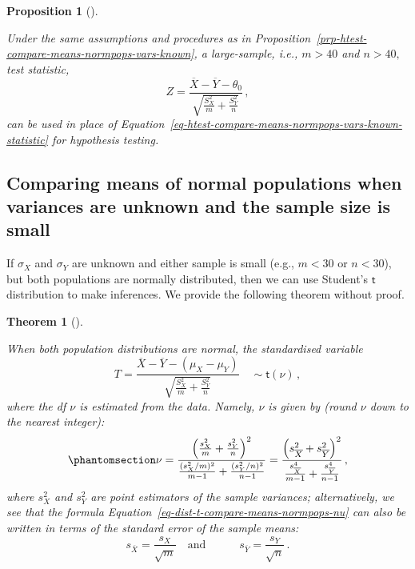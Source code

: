\documentclass[
  a4paper,
  DIV=11,
  numbers=noendperiod,
  oneside]{scrreprt}
\theoremstyle{plain}
\newtheorem{theorem}{Theorem}[chapter]
\theoremstyle{definition}
\theoremstyle{definition}
\theoremstyle{definition}
\theoremstyle{plain}
\newtheorem{proposition}{Proposition}[chapter]
\theoremstyle{remark}
\begin{document}
\begin{proposition}[]\protect\hypertarget{prp-htest-compare-means-large-samples}{}\label{prp-htest-compare-means-large-samples}

Under the same assumptions and procedures as in
Proposition~\ref{prp-htest-compare-means-normpops-vars-known}, a
large-sample, i.e., \(m > 40\) and \(n > 40,\) test statistic, \[
 Z = \frac{\overline{X} - \overline{Y} - \theta_0}{\sqrt{\frac{S_{X}^2}{m} + \frac{S_{Y}^2}{n}}}\,,
\] can be used in place of
Equation~\ref{eq-htest-compare-means-normpops-vars-known-statistic} for
hypothesis testing.

\end{proposition}

\subsection{Comparing means of normal populations when variances are
unknown and the sample size is
small}\label{sec-compare-means-normpops-vars-unknown}

If \(\sigma_X\) and \(\sigma_Y\) are unknown and either sample is small
(e.g., \(m < 30\) or \(n <30\)), but both populations are normally
distributed, then we can use Student's \(\mathsf{t}\) distribution to
make inferences. We provide the following theorem without proof.

\begin{theorem}[]\protect\hypertarget{thm-dist-t-compare-means-normpops}{}\label{thm-dist-t-compare-means-normpops}

When both population distributions are normal, the standardised variable
\[
T = \frac{\overline{X}-\overline{Y} - (\mu_X - \mu_Y)}{\sqrt{\frac{S_X^2}{m} + \frac{S_Y^2}{n}}} 
\quad \sim \mathsf{t}(\nu)\,,
\] where the df \(\nu\) is estimated from the data. Namely, \(\nu\) is
given by (round \(\nu\) down to the nearest integer):
\begin{equation}\phantomsection\label{eq-dist-t-compare-means-normpops-nu}{
 \nu = \frac{ \left( \frac{s_X^2}{m} + \frac{s_Y^2}{n} \right)^2}{\frac{(s_X^2 / m)^2}{m-1} + \frac{(s_Y^2/n)^2}{n-1}} 
 = \frac{ \left( s_{\overline{X}}^2 + s_{\overline{Y}}^2 \right)^2}{\frac{s_{\overline{X}}^4}{m-1} + \frac{s_{\overline{Y}}^4}{n-1}}\,,
}\end{equation} where \(s_X^2\) and \(s_Y^2\) are point estimators of
the sample variances; alternatively, we see that the formula
Equation~\ref{eq-dist-t-compare-means-normpops-nu} can also be written
in terms of the standard error of the sample means: \[
 s_{\overline{X}} = \frac{s_X}{\sqrt{m}} 
 \quad \text{and} \quad \qquad 
 s_{\overline{Y}} = \frac{s_Y}{\sqrt{n}} \,.
\]

\end{theorem}
\end{document}
